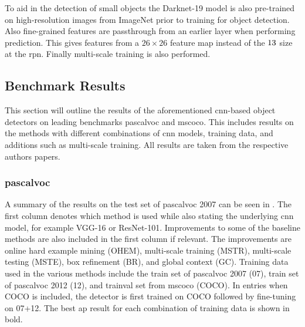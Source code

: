 To aid in the detection of small objects the Darknet-19 model is also pre-trained on high-resolution images from ImageNet prior to training for object detection. Also fine-grained features are passthrough from an earlier layer when performing prediction. This gives features from a $26 \times 26$ feature map instead of the $13 \time 13$ size at the \gls{rpn}. Finally multi-scale training is also performed.

\subsection{Benchmark Results}\label{sec:benchresults}

This section will outline the results of the aforementioned \gls{cnn}-based object detectors on leading benchmarks \gls{pascalvoc} and \gls{mscoco}. This includes results on the methods with different combinations of \gls{cnn} models, training data, and additions such as multi-scale training. All results are taken from the respective authors papers.

\subsubsection{\gls{pascalvoc}}
A summary of the results on the test set of \gls{pascalvoc} 2007 can be seen in . The first column denotes which method is used while also stating the underlying \gls{cnn} model, for example VGG-16 or ResNet-101. Improvements to some of the baseline methods are also included in the first column if relevant. The improvements are online hard example mining (OHEM), multi-scale training (MSTR), multi-scale testing (MSTE), box refinement (BR), and global context (GC). Training data used in the various methods include the train set of \gls{pascalvoc} 2007 (07), train set of \gls{pascalvoc} 2012 (12), and trainval set from \gls{mscoco} (COCO). In entries when COCO is included, the detector is first trained on COCO followed by fine-tuning on 07+12. The best \gls{ap} result for each combination of training data is shown in bold.


